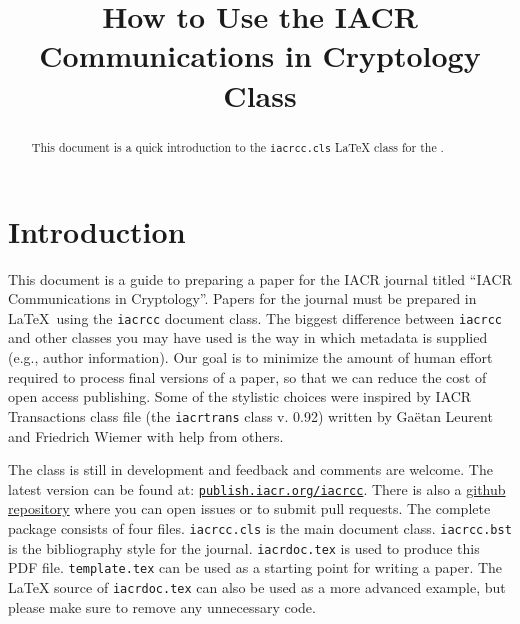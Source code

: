 \documentclass{iacrcc}
\title[running  = {The iacrcc class},
       onclick  = {https://publish.iacr.org/iacrcc},
       subtitle = {LaTeX Class Documentation (v0.24)}
      ]{How to Use the IACR Communications in Cryptology Class}
\affiliation[ror      = 031v4g827,
             onclick  = {https://www.nxp.com},
             street   = {Interleuvenlaan 80},
             city     = {Leuven},
             postcode = {3001},
             country  = {Belgium}
            ]{NXP Semiconductors}
\affiliation{Self}
\begin{document}
\maketitle


\begin{abstract}
  This document is a quick introduction to the \texttt{iacrcc.cls}
  \LaTeX{} class for the \publname{}.
\end{abstract}

\section*{Introduction}

This document is a guide to preparing a paper for the IACR journal
titled ``IACR Communications in Cryptology''.  Papers for the journal
must be prepared in \LaTeX\ using the \texttt{iacrcc} document
class. The biggest difference between \texttt{iacrcc} and other
classes you may have used is the way in which metadata is supplied
(e.g., author information). Our goal is to minimize the amount of
human effort required to process final versions of a paper, so that we
can reduce the cost of open access publishing.  Some of the stylistic
choices were inspired by IACR Transactions class file (the
\texttt{iacrtrans} class v. 0.92) written by Ga{\"e}tan Leurent and
Friedrich Wiemer with help from others.

The class is still in development and feedback and comments are
welcome.  The latest version can be found at:
\href{https://publish.iacr.org/iacrcc}{\texttt{publish.iacr.org/iacrcc}}.
There is also a \href{https://github.com/IACR/latex}{github
  repository} where you can open issues or to submit pull requests.
The complete package consists of four files. \texttt{iacrcc.cls} is
the main document class. \texttt{iacrcc.bst} is the bibliography style
for the journal.  \texttt{iacrdoc.tex} is used to produce this PDF
file. \texttt{template.tex} can be used as a starting point for
writing a paper.  The \LaTeX{} source of \texttt{iacrdoc.tex} can also
be used as a more advanced example, but please make sure to remove any
unnecessary code.
\end{document}
